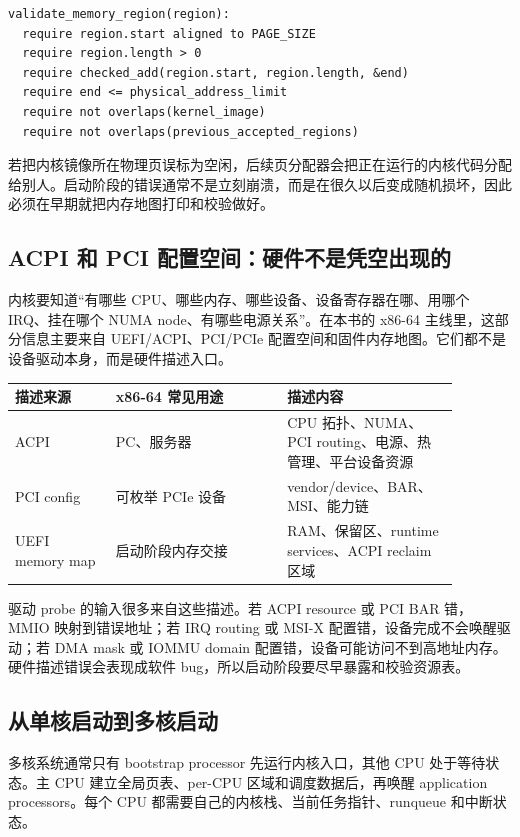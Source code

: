 \begin{lstlisting}
validate_memory_region(region):
  require region.start aligned to PAGE_SIZE
  require region.length > 0
  require checked_add(region.start, region.length, &end)
  require end <= physical_address_limit
  require not overlaps(kernel_image)
  require not overlaps(previous_accepted_regions)
\end{lstlisting}

若把内核镜像所在物理页误标为空闲，后续页分配器会把正在运行的内核代码分配给别人。启动阶段的错误通常不是立刻崩溃，而是在很久以后变成随机损坏，因此必须在早期就把内存地图打印和校验做好。

\subsection{ACPI 和 PCI 配置空间：硬件不是凭空出现的}

内核要知道“有哪些 CPU、哪些内存、哪些设备、设备寄存器在哪、用哪个 IRQ、挂在哪个 NUMA node、有哪些电源关系”。在本书的 x86-64 主线里，这部分信息主要来自 UEFI/ACPI、PCI/PCIe 配置空间和固件内存地图。它们都不是设备驱动本身，而是硬件描述入口。

\begin{longtable}{p{0.2\linewidth}p{0.34\linewidth}p{0.34\linewidth}}
\toprule
描述来源 & x86-64 常见用途 & 描述内容 \\
\midrule
ACPI & PC、服务器 & CPU 拓扑、NUMA、PCI routing、电源、热管理、平台设备资源 \\
PCI config & 可枚举 PCIe 设备 & vendor/device、BAR、MSI、能力链 \\
UEFI memory map & 启动阶段内存交接 & RAM、保留区、runtime services、ACPI reclaim 区域 \\
\bottomrule
\end{longtable}

驱动 probe 的输入很多来自这些描述。若 ACPI resource 或 PCI BAR 错，MMIO 映射到错误地址；若 IRQ routing 或 MSI-X 配置错，设备完成不会唤醒驱动；若 DMA mask 或 IOMMU domain 配置错，设备可能访问不到高地址内存。硬件描述错误会表现成软件 bug，所以启动阶段要尽早暴露和校验资源表。

\subsection{从单核启动到多核启动}

多核系统通常只有 bootstrap processor 先运行内核入口，其他 CPU 处于等待状态。主 CPU 建立全局页表、per-CPU 区域和调度数据后，再唤醒 application processors。每个 CPU 都需要自己的内核栈、当前任务指针、runqueue 和中断状态。

